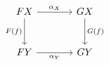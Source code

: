 \documentclass[border=6pt]{standalone}
\begin{document}
$
\begin{tikzcd}[column sep=large, row sep=large]
  FX \arrow[r, "\alpha_X"] \arrow[d, "F(f)"'] & GX \arrow[d, "G(f)"] \\
  FY \arrow[r, "\alpha_Y"'] & GY
\end{tikzcd}
$
\end{document}
